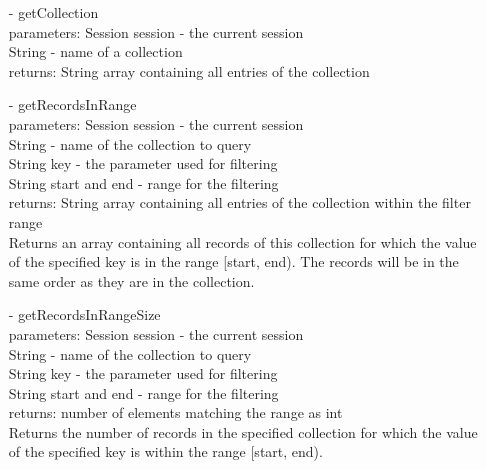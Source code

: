 \documentclass[oneside, english, final]{design}
\begin{document}
\begin{itemize}
\begin{itemize}
		      \item[-]getCollection
		            \\parameters: Session session - the current session
		            \\String - name of a collection
		            \\returns: String array containing all entries of the collection

		      \item[-]getRecordsInRange
		            \\parameters: Session session - the current session
		            \\String - name of the collection to query
		            \\String key - the parameter used for filtering
		            \\String start and end - range for the filtering
		            \\returns: String array containing all entries of the collection within the filter range
		            \\ Returns an array containing all records of this
		            collection for which the value of the
		            specified key is in the range [start, end).
		            The records will be in the same order as
		            they are in the collection.

		      \item[-]getRecordsInRangeSize
		            \\parameters: Session session - the current session
		            \\String - name of the collection to query
		            \\String key - the parameter used for filtering
		            \\String start and end - range for the filtering
		            \\returns: number of elements matching the range as int
		            \\Returns the number of records in the specified
		            collection for which the value of the specified
		            key is within the range [start, end).
	      \end{itemize}



\end{itemize}
\end{document}
